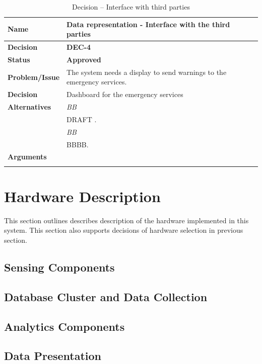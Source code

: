 \begin{table}[h]
\begin{tabular}{L{0.2\textwidth} L{0.6\textwidth}}
    \textbf{Name} 			& \textbf{Data representation - Interface with the third parties} \\ \toprule
    \textbf{Decision} 		& \textbf{DEC-4}\\ \midrule
    \textbf{Status} 		& \textbf{Approved} \\ \midrule
    \textbf{Problem/Issue} 	& The system needs a display to send warnings to the emergency services. \\ \midrule
    \textbf{Decision} 		& Dashboard for the emergency services\\ \midrule
    \textbf{Alternatives} 	& \textit{BB}\\
    						& DRAFT .\\
    						& \textit{BB}\\
    						& BBBB.\\
    						\midrule
    \textbf{Arguments} 		& \\

    \\ \bottomrule
\end{tabular}
\caption{Decision -- Interface with third parties}
\label{table:linux}
\end{table}

\section{Hardware Description}
\label{sec:hardware-description}
This section outlines describes description of the hardware implemented in this system. This section also supports decisions of hardware selection in previous section.

\subsection{Sensing Components}
\label{subsec:sensing-components}

\subsection{Database Cluster and Data Collection}
\label{subsec:database-data}

\subsection{Analytics Components}
\label{subsec:analytics}

\subsection{Data Presentation}
\label{subsec:data-presentation}

